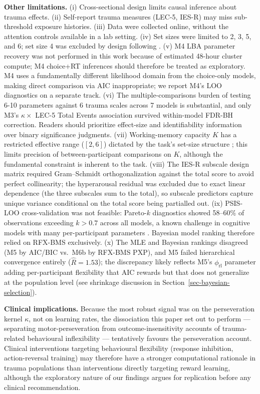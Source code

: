 \documentclass{article}
\begin{document}
\textbf{Other limitations.} (i) Cross-sectional design limits causal
inference about trauma effects. (ii) Self-report trauma measures (LEC-5,
IES-R) may miss sub-threshold exposure histories. (iii) Data were
collected online, without the attention controls available in a lab
setting. (iv) Set sizes were limited to 2, 3, 5, and 6; set size 4 was
excluded by design following \citet{senta2025}. (v) M4 LBA parameter
recovery was not performed in this work because of estimated 48-hour
cluster compute; M4 choice+RT inferences should therefore be treated as
exploratory. M4 uses a fundamentally different likelihood domain from
the choice-only models, making direct comparison via AIC inappropriate;
we report M4's LOO diagnostics on a separate track. (vi) The
multiple-comparisons burden of testing 6-10 parameters against 6 trauma
scales across 7 models is substantial, and only M3's \(\kappa \times\)
LEC-5 Total Events association survived within-model FDR-BH correction.
Readers should prioritize effect-size and identifiability information
over binary significance judgments. (vii) Working-memory capacity \(K\)
has a restricted effective range (\([2, 6]\)) dictated by the task's
set-size structure \citep{collins2012how}; this limits precision of
between-participant comparisons on \(K\), although the fundamental
constraint is inherent to the task. (viii) The IES-R subscale design
matrix required Gram--Schmidt orthogonalization against the total score
to avoid perfect collinearity; the hyperarousal residual was excluded
due to exact linear dependence (the three subscales sum to the total),
so subscale predictors capture unique variance conditional on the total
score being partialled out. (ix) PSIS-LOO cross-validation was not
feasible: Pareto-\(k\) diagnostics showed 58--60\% of observations
exceeding \(k > 0.7\) across all models, a known challenge in cognitive
models with many per-participant parameters
\citep{vehtari2017practical}. Bayesian model ranking therefore relied on
RFX-BMS exclusively. (x) The MLE and Bayesian rankings disagreed (M5 by
AIC/BIC vs.~M6b by RFX-BMS PXP), and M5 failed hierarchical convergence
entirely (\(\hat{R} = 1.53\)); the discrepancy likely reflects M5's
\(\phi_{\text{rl}}\) parameter adding per-participant flexibility that
AIC rewards but that does not generalize at the population level (see
shrinkage discussion in Section~\ref{sec-bayesian-selection}).

\textbf{Clinical implications.} Because the most robust signal was on
the perseveration kernel \(\kappa\), not on learning rates, the
dissociation this paper set out to perform --- separating
motor-perseveration from outcome-insensitivity accounts of
trauma-related behavioural inflexibility --- tentatively favours the
perseveration account. Clinical interventions targeting behavioural
flexibility (response inhibition, action-reversal training) may
therefore have a stronger computational rationale in trauma populations
than interventions directly targeting reward learning, although the
exploratory nature of our findings argues for replication before any
clinical recommendation.
\end{document}

